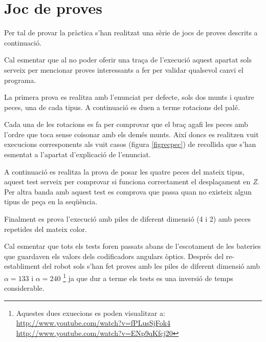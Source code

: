 \section{Joc de proves}

Per tal de provar la pràctica s'han realitzat una sèrie de jocs de proves
descrits a continuació.

Cal esmentar que al no poder oferir una traça de l'execució
aquest apartat sols serveix per mencionar proves interessants a fer
per validar qualsevol canvi el programa.

La primera prova es realitza amb l'enunciat per defecte, sols dos munts i
quatre peces, una de cada tipus. A continuació es duen a terme rotacions
del palé.

Cada una de les rotacions es fa per comprovar que el braç agafi les
peces amb l'ordre que toca sense co\lgem isonar amb els demés munts.
Així doncs es realitzen vuit execucions corresponents als vuit casos
(figura \ref{figrecpec}) de recollida que s'han esmentat a l'apartat
d'explicació de l'enunciat.

A continuació es realitza la prova de posar les quatre peces del mateix tipus,
aquest test serveix per comprovar si funciona correctament el desplaçament
en \emph{Z}. Per altra banda amb aquest test es comprova que passa
quan no existeix algun tipus de peça en la seqüència.

Finalment es prova l'execució amb piles de diferent dimensió (4 i 2)
amb peces repetides del mateix color.

Cal esmentar que tots els tests foren passats abans de l'escotament
de les bateries que guardaven els valors dels codificadors angulars
òptics. Després del re-establiment del robot sols s'han fet proves
amb les piles de diferent dimensió amb $\alpha = 133$ i $\alpha = 240$
\footnote{Aquestes dues exuecions es poden visualitzar a: \\
\url{http://www.youtube.com/watch?v=fPLusSjFok4} \\
\url{http://www.youtube.com/watch?v=ENp9qKfcj20}}
ja que dur a terme els tests es una inversió de temps considerable.
